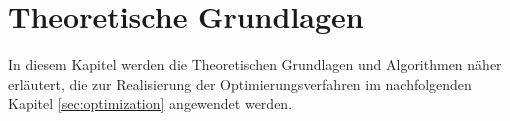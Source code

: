 \chapter{Theoretische Grundlagen} \label{sec:algorithms}

In diesem Kapitel werden die Theoretischen Grundlagen und Algorithmen näher erläutert, die zur Realisierung der Optimierungsverfahren im nachfolgenden Kapitel \ref{sec:optimization} angewendet werden. 










